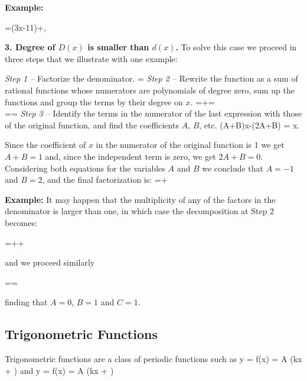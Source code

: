 {\bf Example:}

\bnn
	=(3x-11)+,
\enn

{\bf 3. Degree of $D(x)$ is smaller than $d(x)$. } To solve this case we proceed in three steps that we illustrate with one example:

{\em Step 1 --} Factorize the denominator.
\bnn
	=
\enn
{\em Step 2 --} Rewrite the function as a sum of rational functions whose numerators are polynomials of degree zero, sum up the functions and group the terms by their degree on $x$.
\bnn
	=+=\\
	==
\enn
{\em Step 3 --} Identify the terms in the numerator of the last expression with those of the original function, and find the coefficients $A$, $B$, etc.
\bnn
	(A+B)x-(2A+B) = x.
\enn

Since the coefficient of $x$ in the numerator of the original function is 1 we get $A+B=1$ and, since the independent term is zero, we get $2A+B=0$. Considering both equations for the variables $A$ and $B$ we conclude that $A=-1$ and $B=2$, and the final factorization is:
\bnn
	=+
\enn

{\bf Example:} It may happen that the multiplicity of any of the factors in the denominator is larger than one, in which case the decomposition at Step 2 becomes:

\bnn
	=++
\enn

and we proceed similarly

\bnn
	==
\enn

finding that $A=0$, $B=1$ and $C=1$.

\subsection{Trigonometric Functions}
Trigonometric functions are a class of periodic functions such as
\bnn y = f(x) = A \sin(kx + \phi) \quad \mbox{and} \quad
     y = f(x) = A \cos(kx + \phi) \enn

